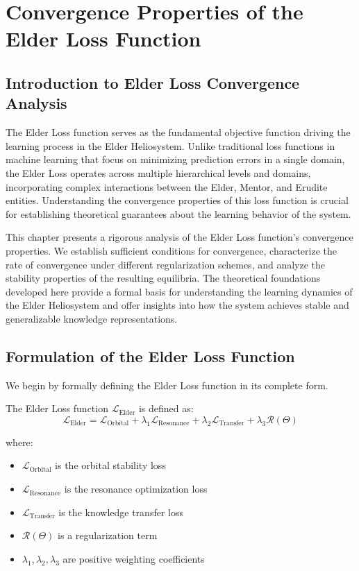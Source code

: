 \chapter{Convergence Properties of the Elder Loss Function}

\section{Introduction to Elder Loss Convergence Analysis}

The Elder Loss function serves as the fundamental objective function driving the learning process in the Elder Heliosystem. Unlike traditional loss functions in machine learning that focus on minimizing prediction errors in a single domain, the Elder Loss operates across multiple hierarchical levels and domains, incorporating complex interactions between the Elder, Mentor, and Erudite entities. Understanding the convergence properties of this loss function is crucial for establishing theoretical guarantees about the learning behavior of the system.

This chapter presents a rigorous analysis of the Elder Loss function's convergence properties. We establish sufficient conditions for convergence, characterize the rate of convergence under different regularization schemes, and analyze the stability properties of the resulting equilibria. The theoretical foundations developed here provide a formal basis for understanding the learning dynamics of the Elder Heliosystem and offer insights into how the system achieves stable and generalizable knowledge representations.

\section{Formulation of the Elder Loss Function}

We begin by formally defining the Elder Loss function in its complete form.

\begin{definition}
The Elder Loss function $\mathcal{L}_{\text{Elder}}$ is defined as:
\begin{equation}
\mathcal{L}_{\text{Elder}} = \mathcal{L}_{\text{Orbital}} + \lambda_1 \mathcal{L}_{\text{Resonance}} + \lambda_2 \mathcal{L}_{\text{Transfer}} + \lambda_3 \mathcal{R}(\Theta)
\end{equation}

where:
\begin{itemize}
    \item $\mathcal{L}_{\text{Orbital}}$ is the orbital stability loss
    \item $\mathcal{L}_{\text{Resonance}}$ is the resonance optimization loss
    \item $\mathcal{L}_{\text{Transfer}}$ is the knowledge transfer loss
    \item $\mathcal{R}(\Theta)$ is a regularization term
    \item $\lambda_1, \lambda_2, \lambda_3$ are positive weighting coefficients
\end{itemize}
\end{definition}

